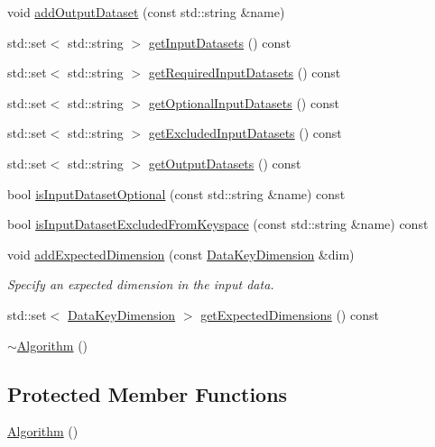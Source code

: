 \begin{DoxyCompactItemize}
void \hyperlink{classBUSBOY_1_1Algorithm_ab71ae1c6e6931b1d161460de7488fba2}{addOutputDataset} (const std::string \&name)
\item 
std::set$<$ std::string $>$ \hyperlink{classBUSBOY_1_1Algorithm_af4ca1a9d2b4fb1c14e148f6c0dac2584}{getInputDatasets} () const 
\item 
std::set$<$ std::string $>$ \hyperlink{classBUSBOY_1_1Algorithm_a11ec297205aa9b6a1509d07eff0d5f68}{getRequiredInputDatasets} () const 
\item 
std::set$<$ std::string $>$ \hyperlink{classBUSBOY_1_1Algorithm_af5d25790065ea0fc6437320ce7f5611a}{getOptionalInputDatasets} () const 
\item 
std::set$<$ std::string $>$ \hyperlink{classBUSBOY_1_1Algorithm_a43526f61b34780c903687cd01fb89ab5}{getExcludedInputDatasets} () const 
\item 
std::set$<$ std::string $>$ \hyperlink{classBUSBOY_1_1Algorithm_ab35abc6b327cdd85e0491fd5dfbd276e}{getOutputDatasets} () const 
\item 
bool \hyperlink{classBUSBOY_1_1Algorithm_ae6f4442c06d26234957c6d70b58376b6}{isInputDatasetOptional} (const std::string \&name) const 
\item 
bool \hyperlink{classBUSBOY_1_1Algorithm_a84be1bb5ee7214202a9ca9040c220890}{isInputDatasetExcludedFromKeyspace} (const std::string \&name) const 
\item 
void \hyperlink{classBUSBOY_1_1Algorithm_a13b0943d17037f88df3a98c61379f187}{addExpectedDimension} (const \hyperlink{classBUSBOY_1_1DataKeyDimension}{DataKeyDimension} \&dim)
\begin{DoxyCompactList}\small\item\em Specify an expected dimension in the input data. \item\end{DoxyCompactList}\item 
std::set$<$ \hyperlink{classBUSBOY_1_1DataKeyDimension}{DataKeyDimension} $>$ \hyperlink{classBUSBOY_1_1Algorithm_a803e451755d780c08aa3ebad3a94826d}{getExpectedDimensions} () const 
\item 
\hyperlink{classBUSBOY_1_1Algorithm_a08fee31bc80865195e9e953772d322cb}{$\sim$Algorithm} ()
\end{DoxyCompactItemize}
\subsection*{Protected Member Functions}
\begin{DoxyCompactItemize}
\item 
\hyperlink{classBUSBOY_1_1Algorithm_a327e1327a32fcac9d6619690595e331d}{Algorithm} ()
\end{DoxyCompactItemize}


